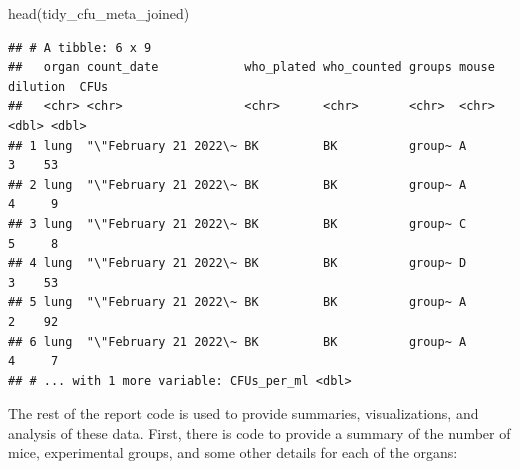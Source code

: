 \documentclass[
]{book}
\newenvironment{Shaded}{\begin{snugshade}}{\end{snugshade}}
\newcommand{\FunctionTok}[1]{\textcolor[rgb]{0.00,0.00,0.00}{#1}}
\newcommand{\NormalTok}[1]{#1}
\begin{document}
\begin{Shaded}
\begin{Highlighting}[]
\FunctionTok{head}\NormalTok{(tidy\_cfu\_meta\_joined)}
\end{Highlighting}
\end{Shaded}

\begin{verbatim}
## # A tibble: 6 x 9
##   organ count_date            who_plated who_counted groups mouse dilution  CFUs
##   <chr> <chr>                 <chr>      <chr>       <chr>  <chr>    <dbl> <dbl>
## 1 lung  "\"February 21 2022\~ BK         BK          group~ A            3    53
## 2 lung  "\"February 21 2022\~ BK         BK          group~ A            4     9
## 3 lung  "\"February 21 2022\~ BK         BK          group~ C            5     8
## 4 lung  "\"February 21 2022\~ BK         BK          group~ D            3    53
## 5 lung  "\"February 21 2022\~ BK         BK          group~ A            2    92
## 6 lung  "\"February 21 2022\~ BK         BK          group~ A            4     7
## # ... with 1 more variable: CFUs_per_ml <dbl>
\end{verbatim}

The rest of the report code is used to provide summaries, visualizations, and
analysis of these data. First, there is code to provide a summary of the number
of mice, experimental groups, and some other details for each of the organs:
\end{document}
